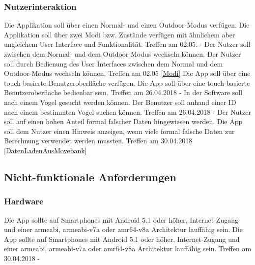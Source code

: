 \documentclass[12pt]{article} %
\begin{document}
\subsubsection{Nutzerinteraktion}

\begin{requirements}[ref={(R\arabic*)},label=(R\arabic*),resume]
{
 Die Applikation soll über einen Normal- und einen Outdoor-Modus verfügen. 
 }{
 Die Applikation soll über zwei Modi bzw. Zustände verfügen mit ähnlichem aber ungleichem User Interface und Funktionalität. 
 }{
 Treffen am 02.05.
 }{
 - 
}
{
 Der Nutzer soll zwischen dem Normal- und dem Outdoor-Modus wechseln können. 
 }{
 Der Nutzer soll durch Bedienung des User Interfaces zwischen dem Normal und dem Outdoor-Modus wechseln können. 
 }{
 Treffen am 02.05 
 }{
 \ref{Modi} 
}
{
 Die App soll über eine touch-basierte Benutzeroberfläche verfügen. 
 }{
 Die App soll über eine touch-basierte Benutzeroberfläche bedienbar sein. 
 }{
 Treffen am 26.04.2018 
 }{
 - 
}
{
 In der Software soll nach einem Vogel gesucht werden können.
 }{
 Der Benutzer soll anhand einer ID nach einem bestimmten Vogel suchen können.
 }{
 Treffen am 26.04.2018
 }{
 -
}
{
 Der Nutzer soll auf einen hohen Anteil formal falscher Daten hingewiesen werden. 
 }{
 Die App soll dem Nutzer einen Hinweis anzeigen, wenn viele formal falsche Daten zur Berechnung verwendet werden mussten.
 }{
 Treffen am 30.04.2018 
 }{
 \ref{DatenLadenAusMovebank} 
}
\end{requirements}

\subsection{Nicht-funktionale Anforderungen}

\subsubsection{Hardware}

\begin{requirements}[ref={(R\arabic*)},label=(R\arabic*),resume]
{
 Die App sollte auf Smartphones mit Android 5.1 oder höher, Internet-Zugang und einer armeabi, armeabi-v7a oder amr64-v8a Architektur lauffähig sein. 
 }{
 Die App sollte auf Smartphones mit Android 5.1 oder höher, Internet-Zugang und einer armeabi, armeabi-v7a oder amr64-v8a Architektur lauffähig sein. 
 }{
 Treffen am 30.04.2018 
 }{
 - 
}
\end{requirements}
\end{document}
